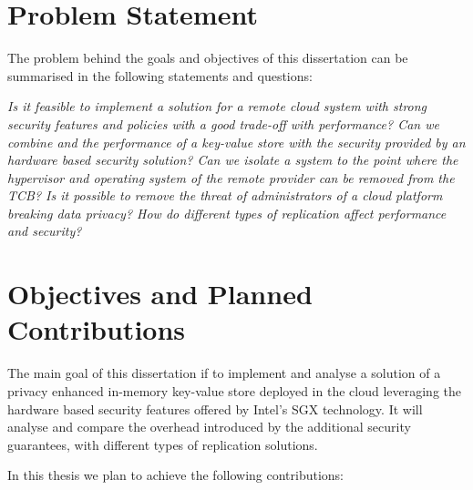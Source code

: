 
\section{Problem Statement} %
\label{sec:problem_statement}

The problem behind the goals and objectives of this dissertation can be summarised in the following statements and questions:

\textit{Is it feasible to implement a solution for a remote cloud system with strong security features and policies with a good trade-off with performance? Can we combine and the performance of a key-value store with the security provided by an hardware based security solution? Can we isolate a system to the point where the hypervisor and operating system of the remote provider can be removed from the \gls{TCB}? Is it possible to remove the threat of administrators of a cloud platform breaking data privacy? How do different types of replication affect performance and security?}

\section{Objectives and Planned Contributions} %
\label{sec:objectives_and_planned_contributions}

The main goal of this dissertation if to implement and analyse a solution of a privacy enhanced in-memory key-value store deployed in the cloud leveraging the hardware based security features offered by Intel's \gls{SGX} technology. It will analyse and compare the overhead introduced by the additional security guarantees, with different types of replication solutions.

In this thesis we plan to achieve the following contributions:

